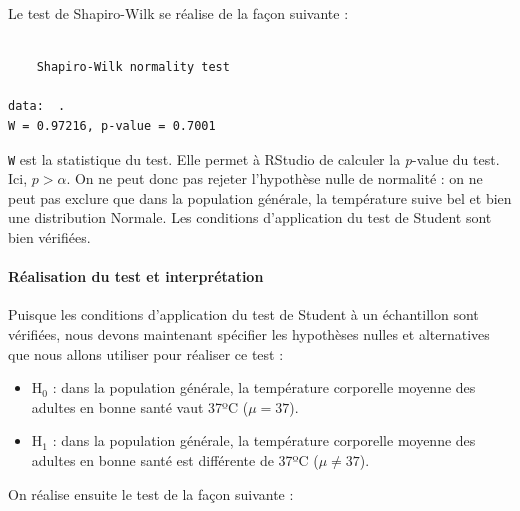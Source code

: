 \documentclass[a4paperpaper,]{article}
\newenvironment{Shaded}{\begin{snugshade}}{\end{snugshade}}
\newcommand{\DataTypeTok}[1]{\textcolor[rgb]{0.00,0.34,0.68}{#1}}
\newcommand{\DecValTok}[1]{\textcolor[rgb]{0.69,0.50,0.00}{#1}}
\newcommand{\KeywordTok}[1]{\textcolor[rgb]{0.12,0.11,0.11}{\textbf{#1}}}
\newcommand{\NormalTok}[1]{\textcolor[rgb]{0.12,0.11,0.11}{#1}}
\newcommand{\OperatorTok}[1]{\textcolor[rgb]{0.12,0.11,0.11}{#1}}
\newcommand{\StringTok}[1]{\textcolor[rgb]{0.75,0.01,0.01}{#1}}
\providecommand{\tightlist}{%
  \setlength{\itemsep}{0pt}\setlength{\parskip}{0pt}}
\let\oldparagraph\paragraph
\renewcommand{\paragraph}[1]{\oldparagraph{#1}\mbox{}}
\begin{document}
Le test de Shapiro-Wilk se réalise de la façon suivante :

\begin{Shaded}
\end{Shaded}

\begin{verbatim}

    Shapiro-Wilk normality test

data:  .
W = 0.97216, p-value = 0.7001
\end{verbatim}

\texttt{W} est la statistique du test. Elle permet à RStudio de calculer la \emph{p}-value du test. Ici, \(p > \alpha\). On ne peut donc pas rejeter l'hypothèse nulle de normalité : on ne peut pas exclure que dans la population générale, la température suive bel et bien une distribution Normale. Les conditions d'application du test de Student sont bien vérifiées.

\hypertarget{ruxe9alisation-du-test-et-interpruxe9tation}{%
\paragraph{Réalisation du test et interprétation}\label{ruxe9alisation-du-test-et-interpruxe9tation}}

Puisque les conditions d'application du test de Student à un échantillon sont vérifiées, nous devons maintenant spécifier les hypothèses nulles et alternatives que nous allons utiliser pour réaliser ce test :

\begin{itemize}
\tightlist
\item
  H\(_0\) : dans la population générale, la température corporelle moyenne des adultes en bonne santé vaut 37ºC (\(\mu = 37\)).
\item
  H\(_1\) : dans la population générale, la température corporelle moyenne des adultes en bonne santé est différente de 37ºC (\(\mu \neq 37\)).
\end{itemize}

On réalise ensuite le test de la façon suivante :

\begin{Shaded}
\end{Shaded}
\end{document}
